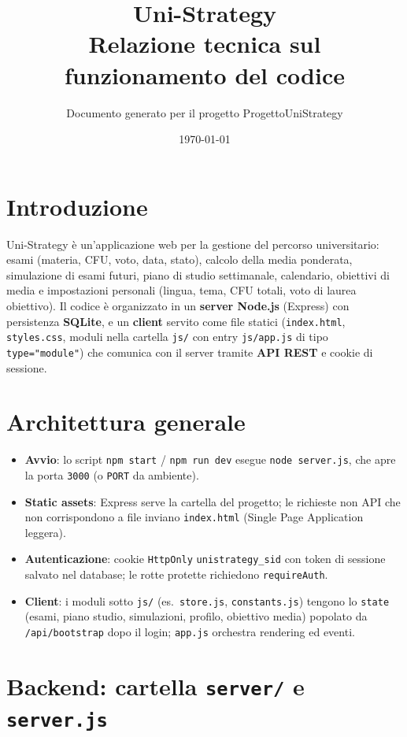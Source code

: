 \documentclass[11pt,a4paper]{article}
\title{Uni-Strategy\\Relazione tecnica sul funzionamento del codice}
\author{Documento generato per il progetto ProgettoUniStrategy}
\date{\today}
\begin{document}
\maketitle
\tableofcontents
\newpage

\section{Introduzione}
Uni-Strategy è un'applicazione web per la gestione del percorso universitario: esami (materia, CFU, voto, data, stato), calcolo della media ponderata, simulazione di esami futuri, piano di studio settimanale, calendario, obiettivi di media e impostazioni personali (lingua, tema, CFU totali, voto di laurea obiettivo). Il codice è organizzato in un \textbf{server Node.js} (Express) con persistenza \textbf{SQLite}, e un \textbf{client} servito come file statici (\texttt{index.html}, \texttt{styles.css}, moduli nella cartella \texttt{js/} con entry \texttt{js/app.js} di tipo \texttt{type="module"}) che comunica con il server tramite \textbf{API REST} e cookie di sessione.

\section{Architettura generale}
\begin{itemize}[leftmargin=*]
  \item \textbf{Avvio}: lo script \texttt{npm start} / \texttt{npm run dev} esegue \texttt{node server.js}, che apre la porta \texttt{3000} (o \texttt{PORT} da ambiente).
  \item \textbf{Static assets}: Express serve la cartella del progetto; le richieste non API che non corrispondono a file inviano \texttt{index.html} (Single Page Application leggera).
  \item \textbf{Autenticazione}: cookie \texttt{HttpOnly} \texttt{unistrategy\_sid} con token di sessione salvato nel database; le rotte protette richiedono \texttt{requireAuth}.
  \item \textbf{Client}: i moduli sotto \texttt{js/} (es.\ \texttt{store.js}, \texttt{constants.js}) tengono lo \texttt{state} (esami, piano studio, simulazioni, profilo, obiettivo media) popolato da \texttt{/api/bootstrap} dopo il login; \texttt{app.js} orchestra rendering ed eventi.
\end{itemize}

\section{Backend: cartella \texttt{server/} e \texttt{server.js}}
\end{document}
